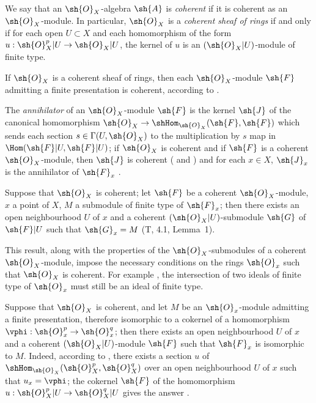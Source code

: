\begin{env}[5.3.7]
\label{0.5.3.7}
We say that an $\sh{O}_X$-algebra $\sh{A}$ is \emph{coherent} if it is coherent as an $\sh{O}_X$-module.
In particular, $\sh{O}_X$ is a \emph{coherent sheaf of rings} if and only if for each open $U\subset X$ and each homomorphism of the form $u:\sh{O}_X^p|U\to\sh{O}_X|U$, the kernel of $u$ is an $(\sh{O}_X|U)$-module of finite type.

If $\sh{O}_X$ is a coherent sheaf of rings, then each $\sh{O}_X$-module $\sh{F}$ admitting a finite presentation  is coherent, according to .

The \emph{annihilator} of an $\sh{O}_X$-module $\sh{F}$ is the kernel $\sh{J}$ of the canonical homomorphism $\sh{O}_X\to\shHom_{\sh{O}_X}(\sh{F},\sh{F})$ which sends each section $s\in\Gamma(U,\sh{O}_X)$ to the multiplication by $s$ map in $\Hom(\sh{F}|U,\sh{F}|U)$;
if $\sh{O}_X$ is coherent and if $\sh{F}$ is a coherent $\sh{O}_X$-module, then $\sh{J}$ is coherent ( and ) and for each $x\in X$, $\sh{J}_x$ is the annihilator of $\sh{F}_x$ .
\end{env}

\begin{env}[5.3.8]
\label{0.5.3.8}
Suppose that $\sh{O}_X$ is coherent;
let $\sh{F}$ be a coherent $\sh{O}_X$-module, $x$ a point of $X$, $M$ a submodule of finite type of $\sh{F}_x$;
then there exists an open neighbourhood $U$ of $x$ and a coherent $(\sh{O}_X|U)$-submodule $\sh{G}$ of $\sh{F}|U$ such that $\sh{G}_x=M$ (T, 4.1, Lemma~1).

This result, along with the properties of the $\sh{O}_X$-submodules of a coherent $\sh{O}_X$-module, impose the necessary conditions on the rings $\sh{O}_x$ such that $\sh{O}_X$ is coherent.
For example , the intersection of two ideals of finite type of $\sh{O}_x$ must still be an ideal of finite type.
\end{env}

\begin{env}[5.3.9]
\label{0.5.3.9}
Suppose that $\sh{O}_X$ is coherent, and let $M$ be an $\sh{O}_x$-module admitting a finite presentation, therefore isomorphic to a cokernel of a homomorphism $\vphi:\sh{O}_x^p\to\sh{O}_x^q$;
then there exists an open neighbourhood $U$ of $x$ and a coherent $(\sh{O}_X|U)$-module $\sh{F}$ such that $\sh{F}_x$ is isomorphic to $M$.
Indeed, according to , there exists a section $u$ of $\shHom_{\sh{O}_X}(\sh{O}_X^p,\sh{O}_X^q)$ over an open neighbourhood $U$ of $x$ such that $u_x=\vphi$;
the cokernel $\sh{F}$ of the homomorphism $u:\sh{O}_X^p|U\to\sh{O}_X^q|U$ gives the answer .
\end{env}

